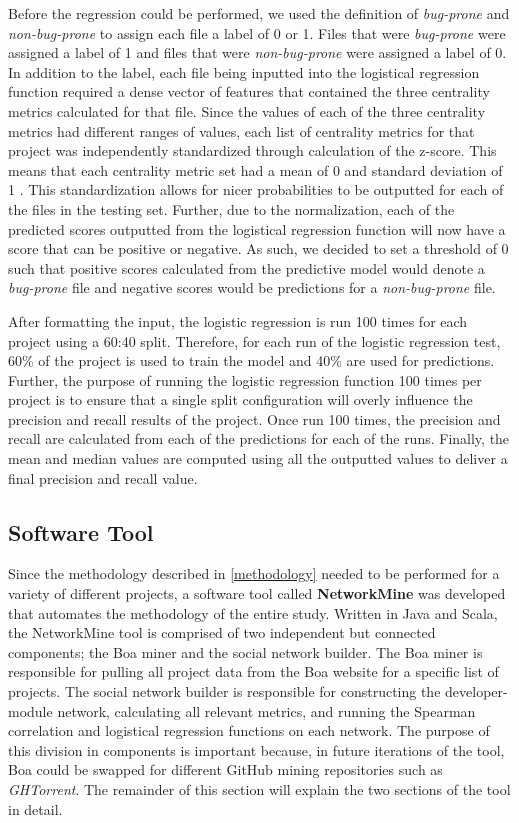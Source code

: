 \documentclass{sig-alternate-05-2015}
\begin{document}
Before the regression could be performed, we used the definition of \textit{bug-prone} and \textit{non-bug-prone} to assign each file a label of 0 or 1. Files that were \textit{bug-prone} were assigned a label of 1 and files that were \textit{non-bug-prone} were assigned a label of 0. In addition to the label, each file being inputted into the logistical regression function required a dense vector of features that contained the three centrality metrics calculated for that file. Since the values of each of the three centrality metrics had different ranges of values, each list of centrality metrics for that project was independently standardized through calculation of the z-score. This means that each centrality metric set had a mean of 0 and standard deviation of 1 \cite{hanneman:network_methods}.  This standardization allows for nicer probabilities to be outputted for each of the files in the testing set. Further, due to the normalization, each of the predicted scores outputted from the logistical regression function will now have a score that can be positive or negative. As such, we decided to set a threshold of 0 such that positive scores calculated from the predictive model would denote a \textit{bug-prone} file and negative scores would be predictions for a \textit{non-bug-prone} file.

After formatting the input, the logistic regression is run 100 times for each project using a 60:40 split. Therefore, for each run of the logistic regression test, 60\% of the project is used to train the model and 40\% are used for predictions. Further, the purpose of running the logistic regression function 100 times per project is to ensure that a single split configuration will overly influence the precision and recall results of the project. Once run 100 times, the precision and recall are calculated from each of the predictions for each of the runs. Finally, the mean and median values are computed using all the outputted values to deliver a final precision and recall value.

\subsection{Software Tool}
\label{software_tool}
Since the methodology described in \ref{methodology} needed to be performed for a variety of different projects, a software tool called \textbf{NetworkMine} was developed that automates the methodology of the entire study. Written in Java and Scala, the NetworkMine tool is comprised of two independent but connected components; the Boa miner and the social network builder. The Boa miner is responsible for pulling all project data from the Boa website for a specific list of projects. The social network builder is responsible for constructing the developer-module network, calculating all relevant metrics, and running the Spearman correlation and logistical regression functions on each network. The purpose of this division in components is important because, in future iterations of the tool, Boa could be swapped for different GitHub mining repositories such as \textit{GHTorrent}. The remainder of this section will explain the two sections of the tool in detail.
\end{document}
